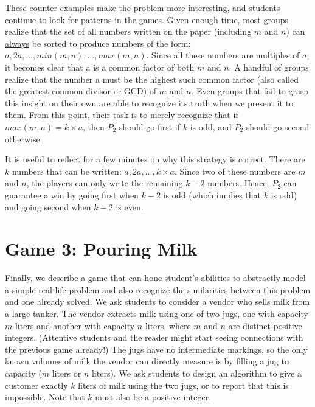 \begin{multicols}{2}
These counter-examples make the problem more interesting, and students continue to look for patterns in the games. Given enough time, most groups realize that the set of all numbers written on the paper (including $m$ and $n$) can \underline{always} be sorted to produce numbers of the form: $a, 2a, ..., min(m, n), ..., max(m, n)$. Since all these numbers are multiples of $a$, it becomes clear that a is a common factor of both $m$ and $n$. A handful of groups realize that the number a must be the highest such common factor (also called the greatest common divisor or GCD) of $m$ and $n$. Even groups that fail to grasp this insight on their own are able to recognize its truth when we present it to them. From this point, their task is to merely recognize that if $max(m, n) = k \times a$, then $P_{2}$ should go first if $k$ is odd, and $P_{2}$ should go second otherwise.

It is useful to reflect for a few minutes on why this strategy is correct. There are $k$ numbers that can be written: $a, 2a, …, k \times a$. Since two of these numbers are $m$ and $n$, the players can only write the remaining $k - 2$ numbers. Hence, $P_{2}$ can guarantee a win by going first when $k - 2$ is odd (which implies that $k$ is odd) and going second when $k - 2$ is even.

\vspace{-.3cm}

\section{Game 3: Pouring Milk}\label{section-5}

\vspace{-.2cm}

Finally, we describe a game that can hone student's abilities to abstractly model a simple real-life problem and also recognize the similarities between this problem and one already solved. We ask students to consider a vendor who sells milk from a large tanker. The vendor extracts milk using one of two jugs, one with capacity $m$ liters and \underline{another} with capacity $n$ liters, where $m$ and $n$ are distinct positive integers. (Attentive students and the reader might start seeing connections with the previous game already!) The jugs have no intermediate markings, so the only known volumes of milk the vendor can directly measure is by filling a jug to capacity ($m$ liters or $n$ liters). We ask students to design an algorithm to give a customer exactly $k$ liters of milk using the two jugs, or to report that this is impossible. Note that $k$ must also be a positive integer.


\end{multicols}

